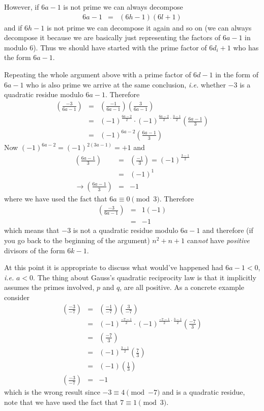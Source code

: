 \documentclass[aps,preprint,preprintnumbers,nofootinbib,showpacs,prd]{revtex4-1}
\newcommand{\ie}{{\it i.e.} }
\newcommand{\nbea}{\begin{eqnarray*}}
\newcommand{\neea}{\end{eqnarray*}}
\begin{document}
However, if $6a - 1$ is not prime we can always decompose
%
\nbea
6a - 1 & = & (6h - 1)(6l + 1)
\neea
%
and if $6h - 1$ is not prime we can decompose it again and so on (we can always decompose it because we are basically just representing the factors of $6a - 1$ in modulo 6). Thus we should have started with the prime factor of $6d_i + 1$ who has the form $6a - 1$.

Repeating the whole argument above with a prime factor of $6d - 1$ in the form of $6a - 1$ who is also prime we arrive at the same conclusion, \ie whether $-3$ is a quadratic residue modulo $6a - 1$. Therefore
%
\nbea
\left ( \frac{-3}{6a - 1} \right ) & = & \left ( \frac{-1}{6a - 1} \right ) \left ( \frac{3}{6a - 1} \right ) \\
& = & (-1)^{\frac{6a - 2}{2}} \cdot (-1)^{\frac{6a-2}{2}\cdot \frac{3-1}{2}}\left ( \frac{6a - 1}{3} \right ) \\
& = &  (-1)^{6a - 2} \left ( \frac{6a - 1}{3} \right )
\neea
%
Now $(-1)^{6a - 2} = (-1)^{2(3a - 1)} = +1$ and
%
\nbea
\left ( \frac{6a - 1}{3} \right ) & = & \left ( \frac{- 1}{3} \right ) = (-1)^{\frac{3-1}{2}} \\
& = & (-1)^1 \\
\to \left ( \frac{6a - 1}{3} \right ) & = & -1 
\neea
%
where we have used the fact that $6a \equiv 0 \pmod{3}$. Therefore
%
\nbea
\left ( \frac{-3}{6a - 1} \right ) & = & 1 (-1) \\
& = & -1
\neea
%
which means that $-3$ is not a quadratic residue modulo $6a-1$ and therefore (if you go back to the beginning of the argument) $n^2 + n + 1$ can{\it not} have {\it positive} divisors of the form $6k - 1$.

At this point it is appropriate to discuss what would've happened had $6a-1 < 0$, \ie $a<0$. The thing about Gauss's quadratic reciprocity law is that it implicitly assumes the primes involved, $p$ and $q$, are all positive. As a concrete example consider
%
\nbea
\left ( \frac{-3}{-7} \right ) & = & \left ( \frac{-1}{-7} \right ) \left ( \frac{3}{-7} \right ) \\
& = & (-1)^{\frac{-7-1}{2}} \cdot (-1)^{\frac{-7-1}{2}\cdot \frac{3-1}{2}} \left ( \frac{-7}{3} \right )  \\
& = & \left ( \frac{-7}{3} \right ) \\
& = & (-1)^{\frac{3-1}{2}} \left ( \frac{7}{3} \right ) \\
& = & (-1) \left ( \frac{1}{3} \right ) \\
\left ( \frac{-3}{-7} \right ) & = & -1
\neea
%
which is the wrong result since $-3 \equiv 4 \pmod{-7}$ and is a quadratic residue, note that we have used the fact that $7 \equiv 1 \pmod{3}$.
\end{document}
